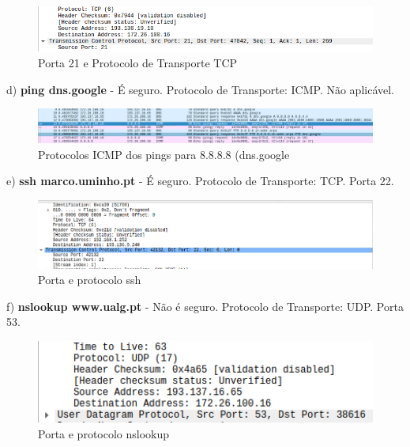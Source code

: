 \documentclass{article}
\begin{document}
\begin{figure}[h!]
    \centering
    \includegraphics[width=1\textwidth]{images/ftp.png}
    \caption{Porta 21 e Protocolo de Transporte TCP}
    \label{fig:enter-label}
\end{figure}

d) \textbf{ping dns.google} - É seguro. Protocolo de Transporte: ICMP. Não aplicável.

\begin{figure}[h!]
    \centering
    \includegraphics[width=1\textwidth]{images/ping.png}
    \caption{Protocolos ICMP dos pings para 8.8.8.8 (dns.google}
    \label{fig:enter-label}
\end{figure}

e) \textbf{ssh marco.uminho.pt} - É seguro. Protocolo de Transporte: TCP. Porta 22.

\begin{figure}[h!]
    \centering
    \includegraphics[width=1\textwidth]{images/ssh.png}
    \caption{\label{fig:pacote}Porta e protocolo ssh}
\end{figure}

f) \textbf{nslookup www.ualg.pt} - Não é seguro. Protocolo de Transporte: UDP. Porta 53.

\begin{figure}[h!]
    \centering
    \includegraphics[width=1\textwidth]{images/nslookup.png}
    \caption{\label{fig:pacote}Porta e protocolo nslookup}
\end{figure}
\end{document}
